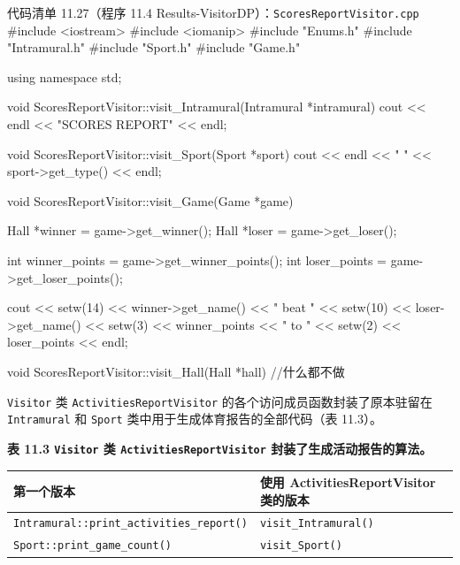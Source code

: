 \begin{codeboxt}{代码清单 11.27（程序 11.4 Results-VisitorDP）：\texttt{Scores\allowbreak{}Report\allowbreak{}Visitor.\allowbreak{}cpp}}
#include <iostream>
#include <iomanip>
#include "Enums.h"
#include "Intramural.h"
#include "Sport.h"
#include "Game.h"

using namespace std;

void ScoresReportVisitor::visit_Intramural(Intramural *intramural)
{
    cout << endl << "SCORES REPORT" << endl;
}

void ScoresReportVisitor::visit_Sport(Sport *sport)
{
    cout << endl << "  " << sport->get_type() << endl;
}

void ScoresReportVisitor::visit_Game(Game *game)
{
    Hall *winner = game->get_winner();
    Hall *loser  = game->get_loser();

    int winner_points = game->get_winner_points();
    int  loser_points = game->get_loser_points();

    cout << setw(14) << winner->get_name() << " beat "
         << setw(10) << loser->get_name()
         << setw(3)  << winner_points
         << " to "   << setw(2) << loser_points << endl;
}

void ScoresReportVisitor::visit_Hall(Hall *hall)
{
    //什么都不做
}
\end{codeboxt}


\texttt{Visitor} 类 \texttt{Activities\allowbreak{}Report\allowbreak{}Visitor} 的各个访问成员函数封装了原本驻留在 \texttt{Intramural} 和 \texttt{Sport} 类中用于生成体育报告的全部代码（表 11.3）。

\begin{center}
{\bfseries 表 11.3 \texttt{Visitor} 类 \texttt{Activities\allowbreak{}Report\allowbreak{}Visitor} 封装了生成活动报告的算法。}\par\vspace{3bp}
\begin{tabularx}{\textwidth}{XX}
\toprule
第一个版本 & 使用 ActivitiesReportVisitor 类的版本 \\
\midrule
\texttt{Intramural::\allowbreak{}print\_\allowbreak{}activities\_\allowbreak{}report(\allowbreak{})\allowbreak{}} & \texttt{visit\_\allowbreak{}Intramural(\allowbreak{})\allowbreak{}} \\
\texttt{Sport::\allowbreak{}print\_\allowbreak{}game\_\allowbreak{}count(\allowbreak{})\allowbreak{}} & \texttt{visit\_\allowbreak{}Sport(\allowbreak{})\allowbreak{}} \\
\bottomrule
\end{tabularx}
\end{center}

